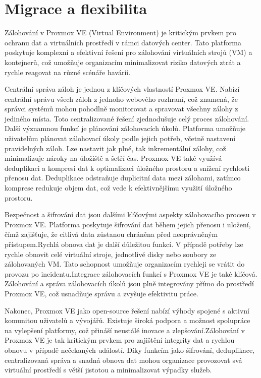 \chapter{Migrace a flexibilita}
Zálohování v Proxmox VE (Virtual Environment) je kritickým prvkem pro ochranu dat a virtuálních prostředí v rámci datových center. Tato platforma poskytuje komplexní a efektivní řešení pro zálohování virtuálních strojů (VM) a kontejnerů, což umožňuje organizacím minimalizovat riziko datových ztrát a rychle reagovat na různé scénáře havárií.

Centrální správa záloh je jednou z klíčových vlastností Proxmox VE. Nabízí centrální správu všech záloh z jednoho webového rozhraní, což znamená, že správci systémů mohou pohodlně monitorovat a spravovat všechny zálohy z jediného místa. Toto centralizované řešení zjednodušuje celý proces zálohování. Další významnou funkcí je plánování zálohovacích úkolů. Platforma umožňuje uživatelům plánovat zálohovací úkoly podle jejich potřeb, včetně nastavení pravidelných záloh. Lze nastavit jak plné, tak inkrementální zálohy, což minimalizuje nároky na úložiště a šetří čas. Proxmox VE také využívá deduplikaci a kompresi dat k optimalizaci úložného prostoru a snížení rychlosti přenosu dat. Deduplikace odstraňuje duplicitní data mezi zálohami, zatímco komprese redukuje objem dat, což vede k efektivnějšímu využití úložného prostoru.

Bezpečnost a šifrování dat jsou dalšími klíčovými aspekty zálohovacího procesu v Proxmox VE. Platforma poskytuje šifrování dat během jejich přenosu i uložení, čímž zajišťuje, že citlivá data zůstanou chráněna před neoprávněným přístupem.Rychlá obnova dat je další důležitou funkcí. V případě potřeby lze rychle obnovit celé virtuální stroje, jednotlivé disky nebo soubory ze zálohovaných VM. Tato schopnost umožňuje organizacím rychleji se vrátit do provozu po incidentu.Integrace zálohovacích funkcí s Proxmox VE je také klíčová. Zálohování a správa zálohovacích úkolů jsou plně integrovány přímo do prostředí Proxmox VE, což usnadňuje správu a zvyšuje efektivitu práce.

Nakonec, Proxmox VE jako open-source řešení nabízí výhody spojené s aktivní komunitou uživatelů a vývojářů. Existuje široká podpora a možnost spolupráce na vylepšení platformy, což přináší neustálé inovace a zlepšování.Zálohování v Proxmox VE je tak kritickým prvkem pro zajištění integrity dat a rychlou obnovu v případě nečekaných událostí. Díky funkcím jako šifrování, deduplikace, centralizovaná správa a snadná obnova dat mohou organizace provozovat svá virtuální prostředí s větší jistotou a minimalizovat výpadky služeb.